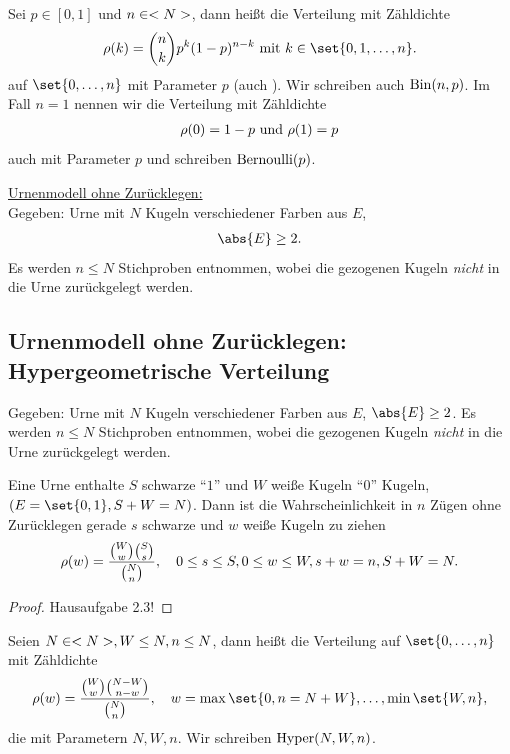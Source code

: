 \begin{definition}
	Sei $p \in [0,1]$ und $n \in <N>$, dann heißt die Verteilung mit Zähldichte
	\begin{align}
		\rho(k) = \binom{n}{k}p^k (1-p)^{n-k} \mit k \in \set{0,1,\dots,n}.\notag
	\end{align}
	 auf $\set{0, \dots,n}$ mit Parameter $p$ (auch ). Wir schreiben auch $\operatorname{Bin}(n,p)$. Im Fall $n = 1$ nennen wir die Verteilung mit Zähldichte
	\begin{align}
		\rho(0) = 1-p \text{ und } \rho(1) = p\notag
	\end{align}
	auch  mit Parameter $p$ und schreiben $\operatorname{Bernoulli}(p)$.
\end{definition}
\underline{Urnenmodell ohne Zurücklegen:} \\
Gegeben: Urne mit $N$ Kugeln verschiedener Farben aus $E$,
\begin{align}
	\abs{E} \ge 2.\notag
\end{align}
Es werden $n \le N$ Stichproben entnommen, wobei die gezogenen Kugeln \emph{nicht} in die Urne zurückgelegt werden.
\subsection{Urnenmodell ohne Zurücklegen: Hypergeometrische Verteilung}
Gegeben: Urne mit $N$ Kugeln verschiedener Farben aus $E$, $\abs{E} \ge 2$. Es werden $n \le N$ Stichproben entnommen, wobei die gezogenen Kugeln \emph{nicht} in die Urne zurückgelegt werden.
\begin{example}
	Eine Urne enthalte $S$ schwarze ``$1$'' und $W$ weiße Kugeln ``$0$'' Kugeln, $(E = \set{0,1}, S + W =N)$. Dann ist die Wahrscheinlichkeit in $n$ Zügen ohne Zurücklegen gerade $s$ schwarze und $w$ weiße Kugeln zu ziehen
	\begin{align}
		\rho(w) = \frac{\binom{W}{w}\binom{S}{s}}{\binom{N}{n}}, \quad 0 \le s \le S, 0 \le w \le W, s+w = n, S+W = N.\notag
	\end{align}
\end{example}
\begin{proof}
	Hausaufgabe 2.3!
\end{proof}
\begin{definition}
	Seien $N \in <N>, W \le N, n \le N$, dann heißt die Verteilung auf $\set{0,\dots,n}$ mit Zähldichte
	\begin{align}
		\rho(w) = \frac{\binom{W}{w}\binom{N-W}{n-w}}{\binom{N}{n}}, \quad w = \max\set{0,n=N+W}, \dots, \min\set{W,n},\notag
	\end{align}
	die  mit Parametern $N,W,n$. Wir schreiben $\operatorname{Hyper}(N,W,n)$.
\end{definition}
